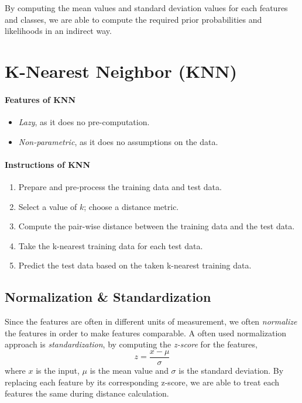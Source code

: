 \documentclass{note}
\begin{document}
By computing the mean values and standard deviation values for each features and classes, we are able to compute the required prior probabilities and likelihoods in an indirect way. 


\section{K-Nearest Neighbor (KNN)}

\paragraph{Features of KNN}

\begin{itemize}
    \item \textit{Lazy}, as it does no pre-computation.
    \item \textit{Non-parametric}, as it does no assumptions on the data.
\end{itemize}

\paragraph{Instructions of KNN}

\begin{enumerate}
    \item Prepare and pre-process the training data and test data.
    \item Select a value of $k$; choose a distance metric.
    \item Compute the pair-wise distance between the training data and the test data.
    \item Take the k-nearest training data for each test data.
    \item Predict the test data based on the taken k-nearest training data.
\end{enumerate}

\subsection{Normalization \& Standardization}
\label{sec:normalization_and_standarization}

Since the features are often in different units of measurement, we often \textit{normalize} the features in order to make features comparable. A often used normalization approach is \textit{standardization}, by computing the \textit{z-score} for the features, 
$$
z = \frac{x - \mu}{\sigma}
$$
where $x$ is the input, $\mu$ is the mean value and $\sigma$ is the standard deviation. By replacing each feature by its corresponding z-score, we are able to treat each features the same during distance calculation.
\end{document}
